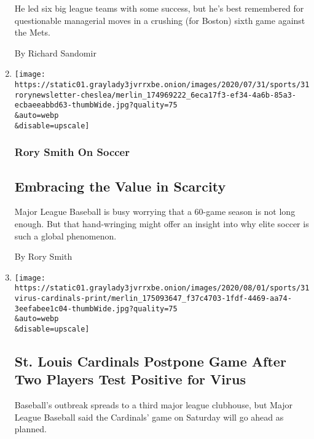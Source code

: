 \begin{enumerate}
  He led six big league teams with some success, but he's best
  remembered for questionable managerial moves in a crushing (for
  Boston) sixth game against the Mets.

  By Richard Sandomir
\item
  \href{/2020/07/31/sports/soccer/soccer-baseball.html}{}

  \texttt{[image: https://static01.graylady3jvrrxbe.onion/images/2020/07/31/sports/31rorynewsletter-cheslea/merlin\_174969222\_6eca17f3-ef34-4a6b-85a3-ecbaeeabbd63-thumbWide.jpg?quality=75\\\&auto=webp\\\&disable=upscale]}

  \hypertarget{rory-smith-on-soccer}{%
  \subsubsection{Rory Smith On Soccer}\label{rory-smith-on-soccer}}

  \hypertarget{embracing-the-value-in-scarcity}{%
  \subsection{Embracing the Value in
  Scarcity}\label{embracing-the-value-in-scarcity}}

  Major League Baseball is busy worrying that a 60-game season is not
  long enough. But that hand-wringing might offer an insight into why
  elite soccer is such a global phenomenon.

  By Rory Smith
\item
  \href{/2020/07/31/sports/baseball/cardinals-twins-coronavirus-mlb.html}{}

  \texttt{[image: https://static01.graylady3jvrrxbe.onion/images/2020/08/01/sports/31virus-cardinals-print/merlin\_175093647\_f37c4703-1fdf-4469-aa74-3eefabee1c04-thumbWide.jpg?quality=75\\\&auto=webp\\\&disable=upscale]}

  \hypertarget{st-louis-cardinals-postpone-game-after-two-players-test-positive-for-virus}{%
  \subsection{St. Louis Cardinals Postpone Game After Two Players Test
  Positive for
  Virus}\label{st-louis-cardinals-postpone-game-after-two-players-test-positive-for-virus}}

  Baseball's outbreak spreads to a third major league clubhouse, but
  Major League Baseball said the Cardinals' game on Saturday will go
  ahead as planned.


\end{enumerate}
